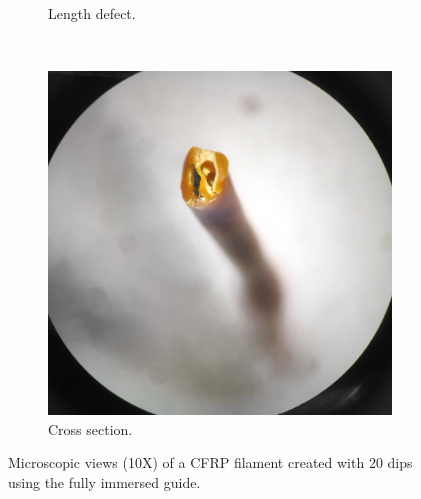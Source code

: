 \begin{figure}[h!]
\begin{subfigure}[b]{0.3\textwidth}
                \caption{Length defect.}
                \label{fig:20-og-defect}
        \end{subfigure}
        ~ %
        \begin{subfigure}[b]{0.3\textwidth}
                \includegraphics[width=\textwidth]{./figures/20-ng-end}
                \caption{Cross section.}
                \label{fig:20-og-end}
        \end{subfigure}
        \caption{Microscopic views (10X) of a CFRP filament created with 20 dips using the fully immersed guide.}\label{fig:20-ng}
\end{figure}


